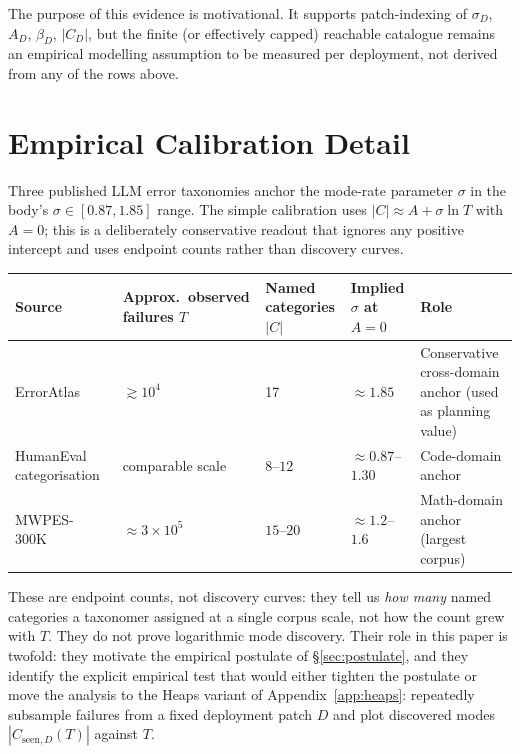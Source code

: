 \documentclass{article}
\theoremstyle{taeplain}
\theoremstyle{taedefn}
\newcommand{\teApprox}{\ensuremath{\approx}}
\begin{document}
The purpose of this evidence is motivational. It supports patch-indexing of $\sigma_D$, $A_D$, $\beta_D$, $|C_D|$, but the finite (or effectively capped) reachable catalogue remains an empirical modelling assumption to be measured per deployment, not derived from any of the rows above.

\section{Empirical Calibration Detail}
\label{app:calibration}

Three published LLM error taxonomies anchor the mode-rate parameter $\sigma$ in the body's $\sigma \in [0.87, 1.85]$ range. The simple calibration uses $|C| \approx A + \sigma \ln T$ with $A = 0$; this is a deliberately conservative readout that ignores any positive intercept and uses endpoint counts rather than discovery curves.

\begin{center}
\small
\begin{tabular}{p{3.5cm}p{2.6cm}p{1.8cm}p{2.4cm}p{3.2cm}}
\toprule
\textbf{Source} & \textbf{Approx.\ observed failures $T$} & \textbf{Named categories $|C|$} & \textbf{Implied $\sigma$ at $A=0$} & \textbf{Role} \\
\midrule
ErrorAtlas~\citep{ashurytahan2026erroratlas} & $\gtrsim 10^4$ & 17 & $\teApprox 1.85$ & Conservative cross-domain anchor (used as planning value) \\
\midrule
HumanEval categorisation~\citep{wen2024fixing} & comparable scale & $8$--$12$ & $\teApprox 0.87$--$1.30$ & Code-domain anchor \\
\midrule
MWPES-300K~\citep{sun2025mwpes} & $\teApprox 3 \times 10^5$ & $15$--$20$ & $\teApprox 1.2$--$1.6$ & Math-domain anchor (largest corpus) \\
\bottomrule
\end{tabular}
\end{center}

These are endpoint counts, not discovery curves: they tell us \emph{how many} named categories a taxonomer assigned at a single corpus scale, not how the count grew with $T$. They do not prove logarithmic mode discovery. Their role in this paper is twofold: they motivate the empirical postulate of \S\ref{sec:postulate}, and they identify the explicit empirical test that would either tighten the postulate or move the analysis to the Heaps variant of Appendix~\ref{app:heaps}: repeatedly subsample failures from a fixed deployment patch $D$ and plot discovered modes $|C_{\text{seen},D}(T)|$ against $T$.

% 
\end{document}
